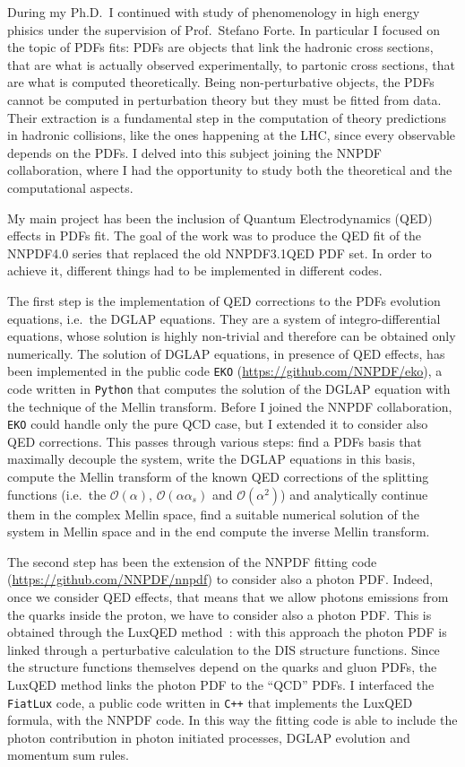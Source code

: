 \documentclass[11pt,a4paper]{moderncv}        %
\begin{document}
During my Ph.D.\ I continued with study of phenomenology in high energy phisics under the supervision of Prof.\ Stefano Forte.
In particular I focused on the topic of PDFs fits: PDFs are objects that link the hadronic cross sections,
that are what is actually observed experimentally, to partonic cross sections, that are what is computed theoretically.
Being non-perturbative objects, the PDFs cannot be computed in perturbation theory but they must be fitted from data.
Their extraction is a fundamental step in the computation of theory predictions in hadronic collisions, like the ones happening 
at the LHC, since every observable depends on the PDFs.
I delved into this subject joining the NNPDF collaboration, where I had the opportunity to study both the theoretical and the
computational aspects.

My main project has been the inclusion of Quantum Electrodynamics (QED) effects in PDFs fit.
The goal of the work was to produce the QED fit of the NNPDF4.0 series that replaced the old NNPDF3.1QED PDF set.
In order to achieve it, different things had to be implemented in different codes.

The first step is the implementation of QED corrections to the PDFs evolution equations, i.e.\ the DGLAP equations.
They are a system of integro-differential equations, whose solution is highly non-trivial and therefore can be obtained only numerically.
The solution of DGLAP equations, in presence of QED effects, has been implemented in the public code \texttt{EKO}
(\url{https://github.com/NNPDF/eko}), a code written in \texttt{Python} that computes the solution of the DGLAP equation with the
technique of the Mellin transform.
Before I joined the NNPDF collaboration, \texttt{EKO} could handle only the pure QCD case, but I extended it to consider also QED corrections.
This passes through various steps: find a PDFs basis that maximally decouple the system, write the DGLAP equations in this basis,
compute the Mellin transform of the known QED corrections of the splitting functions
(i.e.\ the $\mathcal{O}(\alpha)$, $\mathcal{O}(\alpha \alpha_s)$ and $\mathcal{O}(\alpha^2)$) and analytically continue them in the complex Mellin space,
find a suitable numerical solution of the system in Mellin space and in the end compute the inverse Mellin transform.

The second step has been the extension of the NNPDF fitting code (\url{https://github.com/NNPDF/nnpdf}) to consider also
a photon PDF.
Indeed, once we consider QED effects, that means that we allow photons emissions from the quarks inside the proton, we have to consider also
a photon PDF.
This is obtained through the LuxQED method~\cite{Manohar:2016nzj, Manohar:2017eqh}: with this approach the photon PDF is linked through
a perturbative calculation to the DIS structure functions.
Since the structure functions themselves depend on the quarks and gluon PDFs, the LuxQED method links the photon PDF to the ``QCD'' PDFs.
I interfaced the \texttt{FiatLux} code, a public code written in \texttt{C++} that implements the LuxQED formula, with the NNPDF code.
In this way the fitting code is able to include the photon contribution in photon initiated processes, DGLAP evolution and momentum sum rules.
\end{document}
